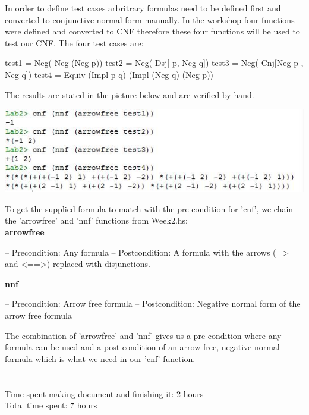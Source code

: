\documentclass{article}
\begin{document}
In order to define test cases arbritrary formulas need to be defined first and converted to conjunctive normal form manually. In the workshop four functions were defined and converted to CNF therefore these four functions will be used to test our CNF. 
The four test cases are:

\begin{code}
test1 = Neg( Neg (Neg p))
test2 = Neg( Dsj[ p, Neg q])
test3 = Neg( Cnj[Neg p , Neg q])
test4 = Equiv (Impl p q) (Impl (Neg q) (Neg p))
\end{code}

The results are stated in the picture below and are verified by hand.

\includegraphics{Knipsel2}

To get the supplied formula to match with the pre-condition for 'cnf', we chain the 'arrowfree' and 'nnf' functions from Week2.hs:\\

\textbf{arrowfree}
\begin{code}
-- Precondition: Any formula
-- Postcondition: A formula with the arrows (=> and <==>) replaced with disjunctions.
\end{code}


\textbf{nnf}
\begin{code}
-- Precondition: Arrow free formula
-- Postcondition: Negative normal form of the arrow free formula
\end{code}
The combination of 'arrowfree' and 'nnf' gives us a pre-condition where any formula can be used and a post-condition of an arrow free, negative normal formula which is what we need in our 'cnf' function.
\\
\\
\\
Time spent making document and finishing it: 2 hours\\
Total time spent: 7 hours
\end{document}

